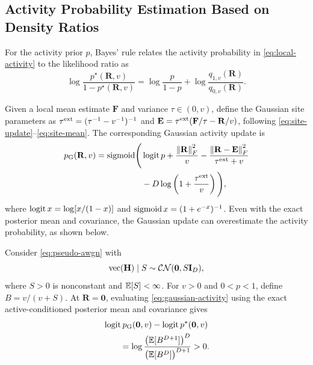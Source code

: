 \subsection{Activity Probability Estimation Based on Density Ratios}
\label{sec:density-ratio}

For the activity prior $p$, Bayes' rule relates the activity probability
in \eqref{eq:local-activity} to the likelihood ratio as
\begin{equation}
 \log\frac{p^\star(\mathbf R,v)}{1-p^\star(\mathbf R,v)}
 =\log\frac{p}{1-p}
  +\log\frac{q_{1,v}(\mathbf R)}{q_{0,v}(\mathbf R)}.
 \label{eq:activity-log-odds}
\end{equation}

Given a local mean estimate $\mathbf F$ and variance $\tau\in(0,v)$,
define the Gaussian site parameters as
$\tau^{\rm ext}=(\tau^{-1}-v^{-1})^{-1}$ and
$\mathbf E=\tau^{\rm ext}(\mathbf F/\tau-\mathbf R/v)$,
following \eqref{eq:site-update}--\eqref{eq:site-mean}.
The corresponding Gaussian activity update is \cite{cai2026}
\begin{equation}
 \begin{aligned}
 p_{\rm G}(\mathbf R,v)=\operatorname{sigmoid}\!\Bigg(&\operatorname{logit} p
 +\frac{\left\lVert\mathbf R\right\rVert_F^2}{v}
 -\frac{\left\lVert\mathbf R-\mathbf E\right\rVert_F^2}{\tau^{\rm ext}+v}\\
 &-D\log\left(1+\frac{\tau^{\rm ext}}{v}\right)\Bigg),
 \end{aligned}
 \label{eq:gaussian-activity}
\end{equation}
where $\operatorname{logit} x=\log[x/(1-x)]$ and $\operatorname{sigmoid} x=(1+e^{-x})^{-1}$.
Even with the exact posterior mean and covariance, the Gaussian update
can overestimate the activity probability, as shown below.

\begin{proposition}
\label{prop:gaussian-activity-bias}
Consider \eqref{eq:pseudo-awgn} with
\begin{equation*}
 \operatorname{vec}(\mathbf H)\mid S\sim\mathcal{CN}(\mathbf0,S\mathbf{I}_D),
\end{equation*}
where $S>0$ is nonconstant and $\mathbb{E}[S]<\infty$.
For $v>0$ and $0<p<1$, define $B=v/(v+S)$.
At $\mathbf R=\mathbf0$, evaluating \eqref{eq:gaussian-activity}
using the exact active-conditioned posterior mean and covariance gives
\begin{equation}
 \begin{aligned}
 &\operatorname{logit} p_{\rm G}(\mathbf0,v)-\operatorname{logit} p^\star(\mathbf0,v)\\
 &\qquad=\log\frac{\bigl(\mathbb{E}[B^{D+1}]\bigr)^D}
                         {\bigl(\mathbb{E}[B^D]\bigr)^{D+1}}>0.
 \end{aligned}
 \label{eq:gaussian-activity-bias}
\end{equation}
\end{proposition}

